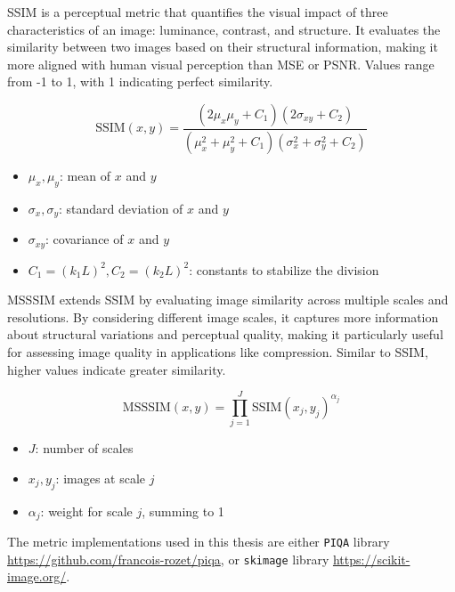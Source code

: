 \Gls{SSIM} is a perceptual metric that quantifies the visual impact of three characteristics of an image: luminance, contrast, and structure. It evaluates the similarity between two images based on their structural information, making it more aligned with human visual perception than MSE or PSNR. Values range from -1 to 1, with 1 indicating perfect similarity.
\begin{note}
    {}
    \begin{equation}    
        \text{SSIM}(x, y) = \frac{(2\mu_x \mu_y + C_1)(2\sigma_{xy} + C_2)}{(\mu_x^2 + \mu_y^2 + C_1)(\sigma_x^2 + \sigma_y^2 + C_2)}
    \end{equation}
    \begin{itemize}
        \item $\mu_x, \mu_y$: mean of $x$ and $y$
        \item $\sigma_x, \sigma_y$: standard deviation of $x$ and $y$
        \item $\sigma_{xy}$: covariance of $x$ and $y$
        \item $C_1 = (k_1L)^2, C_2 = (k_2L)^2$: constants to stabilize the division
    \end{itemize}
\end{note}

\Gls{MSSSIM} extends \gls{SSIM} by evaluating image similarity across multiple scales and resolutions. By considering different image scales, it captures more information about structural variations and perceptual quality, making it particularly useful for assessing image quality in applications like compression. Similar to \gls{SSIM}, higher values indicate greater similarity.

\begin{note}
    {}
    \begin{equation}\label{eq:msssim}    
        \text{MSSSIM}(x, y) = \prod_{j=1}^{J} \text{SSIM}(x_j, y_j)^{\alpha_j}
    \end{equation}
    \begin{itemize}
        \item $J$: number of scales
        \item $x_j, y_j$: images at scale $j$
        \item $\alpha_j$: weight for scale $j$, summing to 1
    \end{itemize}
\end{note}

The metric implementations used in this thesis are either \texttt{PIQA} library \href{https://github.com/francois-rozet/piqa}{https://github.com/francois-rozet/piqa}, or \texttt{skimage} library \href{https://scikit-image.org/}{https://scikit-image.org/}.
